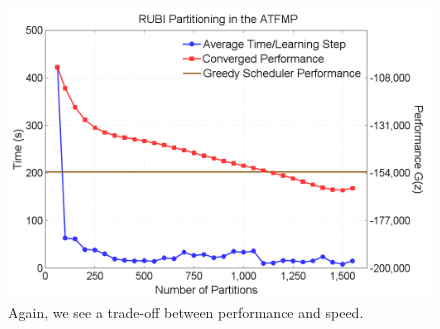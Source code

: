 \documentclass[letterpaper]{article}
\begin{document}




\begin{figure}
\centering
\includegraphics[width=.75\columnwidth]{ATFMPComparisonNoScale}
\caption{Again, we see a trade-off between performance and speed.}
\label{ATFMPNewvsGreedy}
\end{figure}
\end{document}
